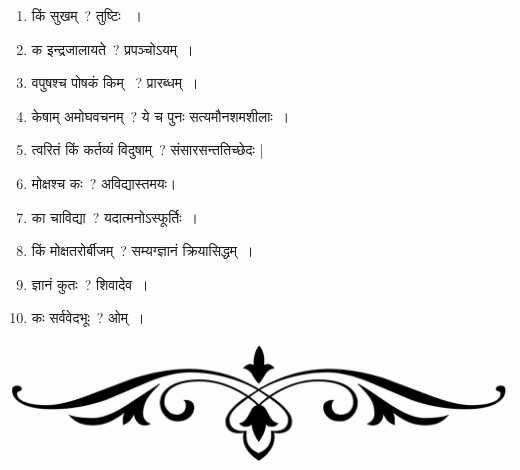 \documentclass[twoside,12pt,notitlepage]{book}
\begin{document}
\begin{enumerate}
	\item किं सुखम्~? 
	तुष्टिः ~।\footB\
	\item क इन्द्रजालायते~? प्रपञ्चोऽयम्~।
	\item वपुषश्च पोषकं किम् ~? 
	प्रारब्धम्~।\footB\
	\item केषाम् अमोघवचनम्~? ये च पुनः सत्यमौनशमशीलाः~।
	\item त्वरितं किं कर्तव्यं विदुषाम्~? संसारसन्ततिच्छेदः |
	\item मोक्षश्च कः~? अविद्यास्तमयः।
	\item का चाविद्या~? यदात्मनोऽस्फूर्तिः~।
	\item किं मोक्षतरोर्बीजम्~? सम्यग्ज्ञानं क्रियासिद्धम्~।
	\item ज्ञानं कुतः~? शिवादेव~।
	\item कः सर्ववेदभूः~? ओम्~।\footB\
\end{enumerate}
\begin{center}\includegraphics[scale=0.08]{end}\end{center}


   
\end{document}
